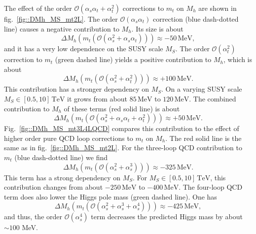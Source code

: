 \documentclass[a4paper,12pt]{book}
\begin{document}
The effect of the order $\mathcal{O}(\alpha_s\alpha_t + \alpha_t^2)$ corrections to $m_t$ on $M_h$ are shown in fig.\ \ref{fig::DMh_MS_mt2L}. The order $\mathcal{O}(\alpha_s\alpha_t)$ correction (blue dash-dotted line) causes a negative contribution to $M_h$.  Its size is about 
\begin{equation}
\Delta M_h(m_t(\mathcal{O}(\alpha_s^2 +\alpha_s\alpha_t))) \approx -50\, \mathrm{MeV},
\end{equation}
and it has a very low dependence on the SUSY scale $M_S$. The order $\mathcal{O}(\alpha^2_t)$ correction to $m_t$ (green dashed line) yields a positive contribution to $M_h$, which is about 
\begin{equation}
\Delta M_h(m_t(\mathcal{O}(\alpha_s^2 +\alpha_t^2))) \approx +100\, \mathrm{MeV}.
\end{equation} 
This contribution has a stronger dependency on $M_S$. On a varying SUSY scale $M_S \in [0.5,10]\,\mathrm{TeV}$ it grows from about $85\, \mathrm{MeV}$ to $120\, \mathrm{MeV}$. The combined contribution to $M_h$ of these terms (red solid line) is about 
\begin{equation}
\Delta M_h(m_t(\mathcal{O}(\alpha_s^2 +\alpha_s\alpha_t+\alpha_t^2))) \approx +50\, \mathrm{MeV}.
\end{equation}
Fig.\ \ref{fig::DMh_MS_mt3L4LQCD} compares this contribution to the effect of higher order pure QCD loop corrections to $m_t$ on $M_h$. The red solid line is the same as in fig.\ \ref{fig::DMh_MS_mt2L}. For the three-loop QCD contribution to $m_t$ (blue dash-dotted line) we find 
\begin{equation}
\Delta M_h(m_t(\mathcal{O}(\alpha_s^2 +\alpha_s^3))) \approx -325\, \mathrm{MeV}.
\end{equation}
This term has a strong dependency on $M_S$. For $M_S \in [0.5,10]\,\mathrm{TeV}$, this contribution changes from about $-250\, \mathrm{MeV}$ to $-400\, \mathrm{MeV}$. The four-loop QCD term does also lower the Higgs pole mass (green dashed line). One has 
\begin{equation}
\Delta M_h(m_t(\mathcal{O}(\alpha_s^2 +\alpha_s^3+\alpha_s^4))) \approx -425\, \mathrm{MeV},
\end{equation}
and thus, the order $\mathcal{O}(\alpha_s^4)$ term decreases the predicted Higgs mass by about $\sim 100$ MeV. 
\end{document}
